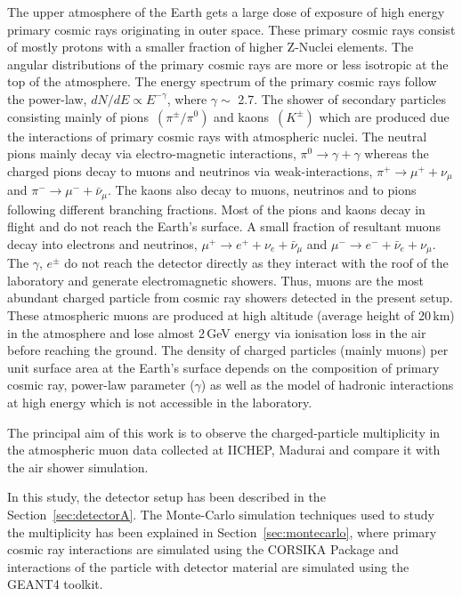 The upper atmosphere of the Earth gets a large dose of exposure of
high energy primary cosmic rays originating in outer space. These
primary cosmic rays consist of mostly protons with a smaller fraction
of higher \mbox{Z-Nuclei} elements\cite{cosmic1}. The angular
distributions of the primary cosmic rays are more or less isotropic
at the top of the atmosphere. The energy spectrum of the primary
cosmic rays follow the power-law, $dN/dE \propto E^{-\gamma}$,
where $\gamma \sim $ 2.7. The shower of secondary
particles consisting mainly of
\mbox{pions $\left(\pi^{\pm}/\pi^0\right)$} and
\mbox{kaons $\left(K^{\pm}\right)$} which are produced due the
interactions of primary cosmic rays with atmospheric nuclei.
The neutral pions mainly decay via electro-magnetic interactions,
$\pi^0 \rightarrow \gamma+\gamma$ whereas the charged pions decay to
muons and neutrinos via weak-interactions,
$\pi^+ \rightarrow \mu^+ + \nu_{\mu}$ and
$\pi^- \rightarrow \mu^- + \bar{\nu}_{\mu}$. The kaons also decay to
muons, neutrinos and to pions following different branching fractions.
Most of the pions and kaons decay in flight and do not reach the
Earth's surface.
A small fraction of resultant muons decay into
electrons and neutrinos, 
$\mu^+ \rightarrow e^+ + \nu_{e} + \bar{\nu}_{\mu}$ and 
$\mu^- \rightarrow e^- + \bar{\nu}_{e} + \nu_{\mu}$. 
The $\gamma$, $e^{\pm}$ do not reach the detector directly as they
interact with the roof of the laboratory and generate electromagnetic
showers.
Thus, muons are the
most abundant charged particle from cosmic ray showers detected in the
present setup. These atmospheric muons are produced at high altitude
(average height of 20\,km) in the atmosphere and lose almost 2\,GeV
energy via ionisation loss in the air before reaching the ground. The 
density of charged particles (mainly muons) per unit surface area at
the Earth's surface depends on the composition of primary cosmic ray,
power-law parameter ($\gamma$) as well as the model of hadronic
interactions at high energy which is not accessible in the laboratory.

The principal aim of this work is to observe the charged-particle
multiplicity in the atmospheric muon data collected
at IICHEP, Madurai and compare it with the air shower simulation.

In this study, the detector setup has been described in
the Section~\ref{sec:detectorA}. The Monte-Carlo simulation techniques
used to study the multiplicity has been explained in
Section~\ref{sec:montecarlo}, where primary cosmic ray interactions
are simulated using the CORSIKA Package\cite{corsika763} and
interactions of the particle with detector material are simulated
using the GEANT4 toolkit\cite{geant4}.


